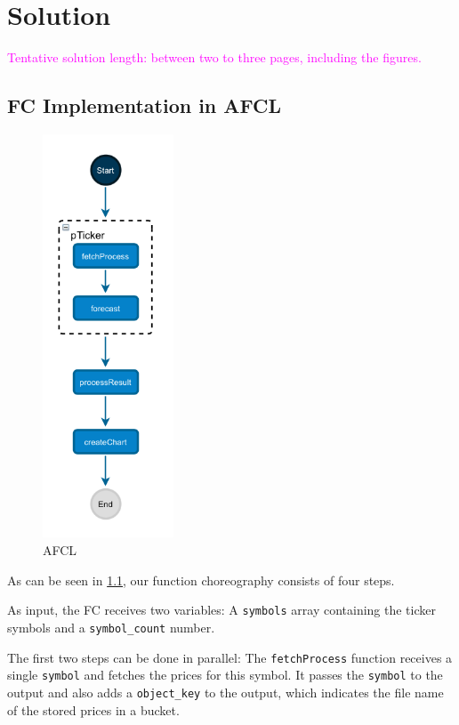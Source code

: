 \chapter{\label{chap:solution}Solution}

\textcolor{magenta}{Tentative solution length: between two to three pages, including the figures.}


%
%
%
\section{FC Implementation in AFCL}


\begin{figure}[h]
  \centering
  \includegraphics[height=12cm, keepaspectratio]{./assets/afcl}
  \caption{AFCL}
  \label{fig:afcl}
\end{figure}

As can be seen in \cref{fig:afcl}, our function choreography consists of
four steps.

As input, the FC receives two variables: A \texttt{symbols} array containing
the ticker symbols and a \texttt{symbol\_count} number.

The first two steps can be done in parallel: The \texttt{fetchProcess} function
receives a single \texttt{symbol} and fetches the prices for this symbol. It
passes the \texttt{symbol} to the output and also adds a \texttt{object\_key}
to the output, which indicates the file name of the stored prices in a bucket.

